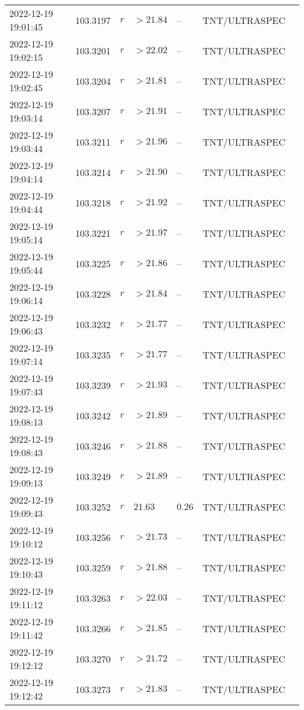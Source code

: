 \documentclass{nature_plusfigure}
\begin{document}
\begin{supplement}
\begin{center}
\begin{longtable}{lllllll}
2022-12-19 19:01:45 & 103.3197 & $r$ & $>21.84$ & -- & TNT/ULTRASPEC &  \\ 
2022-12-19 19:02:15 & 103.3201 & $r$ & $>22.02$ & -- & TNT/ULTRASPEC &  \\ 
2022-12-19 19:02:45 & 103.3204 & $r$ & $>21.81$ & -- & TNT/ULTRASPEC &  \\ 
2022-12-19 19:03:14 & 103.3207 & $r$ & $>21.91$ & -- & TNT/ULTRASPEC &  \\ 
2022-12-19 19:03:44 & 103.3211 & $r$ & $>21.96$ & -- & TNT/ULTRASPEC &  \\ 
2022-12-19 19:04:14 & 103.3214 & $r$ & $>21.90$ & -- & TNT/ULTRASPEC &  \\ 
2022-12-19 19:04:44 & 103.3218 & $r$ & $>21.92$ & -- & TNT/ULTRASPEC &  \\ 
2022-12-19 19:05:14 & 103.3221 & $r$ & $>21.97$ & -- & TNT/ULTRASPEC &  \\ 
2022-12-19 19:05:44 & 103.3225 & $r$ & $>21.86$ & -- & TNT/ULTRASPEC &  \\ 
2022-12-19 19:06:14 & 103.3228 & $r$ & $>21.84$ & -- & TNT/ULTRASPEC &  \\ 
2022-12-19 19:06:43 & 103.3232 & $r$ & $>21.77$ & -- & TNT/ULTRASPEC &  \\ 
2022-12-19 19:07:14 & 103.3235 & $r$ & $>21.77$ & -- & TNT/ULTRASPEC &  \\ 
2022-12-19 19:07:43 & 103.3239 & $r$ & $>21.93$ & -- & TNT/ULTRASPEC &  \\ 
2022-12-19 19:08:13 & 103.3242 & $r$ & $>21.89$ & -- & TNT/ULTRASPEC &  \\ 
2022-12-19 19:08:43 & 103.3246 & $r$ & $>21.88$ & -- & TNT/ULTRASPEC &  \\ 
2022-12-19 19:09:13 & 103.3249 & $r$ & $>21.89$ & -- & TNT/ULTRASPEC &  \\ 
2022-12-19 19:09:43 & 103.3252 & $r$ & $21.63$ & $0.26$ & TNT/ULTRASPEC &  \\ 
2022-12-19 19:10:12 & 103.3256 & $r$ & $>21.73$ & -- & TNT/ULTRASPEC &  \\ 
2022-12-19 19:10:43 & 103.3259 & $r$ & $>21.88$ & -- & TNT/ULTRASPEC &  \\ 
2022-12-19 19:11:12 & 103.3263 & $r$ & $>22.03$ & -- & TNT/ULTRASPEC &  \\ 
2022-12-19 19:11:42 & 103.3266 & $r$ & $>21.85$ & -- & TNT/ULTRASPEC &  \\ 
2022-12-19 19:12:12 & 103.3270 & $r$ & $>21.72$ & -- & TNT/ULTRASPEC &  \\ 
2022-12-19 19:12:42 & 103.3273 & $r$ & $>21.83$ & -- & TNT/ULTRASPEC &  \\ 

\end{longtable}
\end{center}
\end{supplement}
\end{document}
